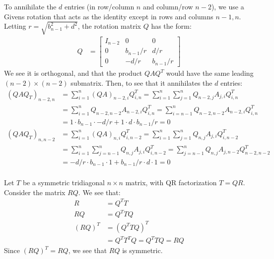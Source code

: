 \documentclass{article}
\begin{document}
To annihilate the $d$ entries (in row/column $n$ and column/row $n - 2$), we use a Givens rotation that acts as the identity except in rows and columns $n - 1, n$. Letting $r = \sqrt{b_{n-1}^2 + d^2}$, the rotation matrix $Q$ has the form:
\begin{align*}
    Q & = \begin{bmatrix}
        I_{n-2} & 0 & 0 \\ 0 & b_{n-1}/r & d/r \\ 0 & -d/r & b_{n-1}/r
    \end{bmatrix}
\end{align*}
We see it is orthogonal, and that the product $QAQ^T$ would have the same leading $(n - 2) \times (n - 2)$ submatrix. Then, to see that it annihilates the $d$ entries:
\begin{align*}
    (QAQ_T)_{n-2,n} & = \sum_{i=1}^n (QA)_{n-2,i}Q^T_{i,n} = \sum_{i=1}^n \sum_{j=1}^n Q_{n-2,j}A_{j,i}Q^T_{i,n} \\
    & = \sum_{i=1}^n Q_{n-2,n-2}A_{n-2,i}Q^T_{i,n} = \sum_{i=n-1}^n Q_{n-2,n-2}A_{n-2,i}Q^T_{i,n} \\
    & = 1 \cdot b_{n-1} \cdot -d/r + 1 \cdot d \cdot b_{n-1}/r = 0 \\
    (QAQ_T)_{n,n-2} & = \sum_{i=1}^n (QA)_{n,i}Q^T_{i,n-2} = \sum_{i=1}^n \sum_{j=1}^n Q_{n,j}A_{j,i}Q^T_{i,n-2} \\
    & = \sum_{i=1}^n \sum_{j=n-1}^n Q_{n,j}A_{j,i}Q^T_{i,n-2} = \sum_{j=n-1}^n Q_{n,j}A_{j,n-2}Q^T_{n-2,n-2} \\
    & = -d/r \cdot b_{n-1} \cdot 1 + b_{n-1}/r \cdot d \cdot 1 = 0 \\
\end{align*}

\clearpage
\problem{}
Let $T$ be a symmetric tridiagonal $n \times n$ matrix, with QR factorization $T = QR$. Consider the matrix $RQ$. We see that:
\begin{align*}
    R & = Q^T T \\
    RQ & = Q^T T Q \\
    (RQ)^T & = (Q^T T Q)^T \\
    & = Q^T T^T Q = Q^T T Q = RQ
\end{align*}
Since $(RQ)^T = RQ$, we see that $RQ$ is symmetric.
\end{document}

